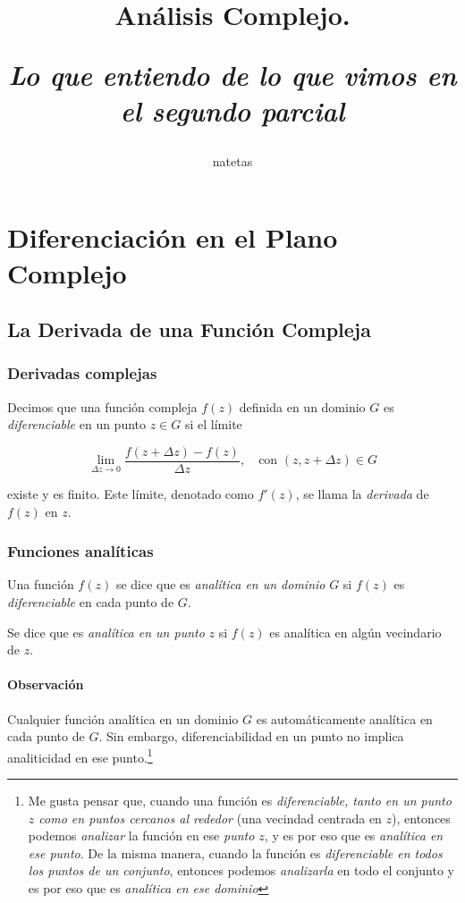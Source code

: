 \documentclass[10pt,a4paper]{book}
\author{natetas}
\title{	Análisis Complejo.
		\\ 
		\begin{small}
			\textit{Lo que entiendo de lo que vimos en el segundo parcial} 
		\end{small}
		}
\begin{document}
\maketitle
\newpage
\tableofcontents

\chapter{Diferenciación en el Plano Complejo}
\section{La Derivada de una Función Compleja}

\subsection{Derivadas complejas}

Decimos que una función compleja $f(z)$ definida en un dominio $G$ es \textit{diferenciable} en un punto $z\in G$ si el límite

\begin{equation}
    \lim_{\Delta z \to 0} \frac{f(z + \Delta z) - f(z)}{\Delta z}, \quad \text{con } (z, z + \Delta z) \in G
\end{equation}

existe y es finito. Este límite, denotado como $f'(z)$, se llama la \textit{derivada} de $f(z)$ en $z$.

\subsection{Funciones analíticas}

Una función $f(z)$ se dice que es \textit{analítica en un dominio} $G$ si $f(z)$ es \textit{diferenciable} en cada punto de $G$. 

Se dice que es \textit{analítica en un punto} $z$ si $f(z)$ es analítica en algún vecindario de $z$. 

\subsubsection*{Observación}
Cualquier función analítica en un dominio $G$ es automáticamente analítica en cada punto de $G$. Sin embargo, diferenciabilidad en un punto no implica analiticidad en ese punto.\footnote{Me gusta pensar que, cuando una función es \textit{diferenciable, tanto en un punto $z$ como en puntos cercanos al rededor} (una vecindad centrada en $z$), entonces podemos \textit{analizar} la función en ese \textit{punto $z$}, y es por eso que es \textit{analítica en ese punto}. De la misma manera, cuando la función es \textit{diferenciable en todos los puntos de un conjunto}, entonces podemos \textit{analizarla} en todo el conjunto y es por eso que es \textit{analítica en ese dominio} }
\end{document}
